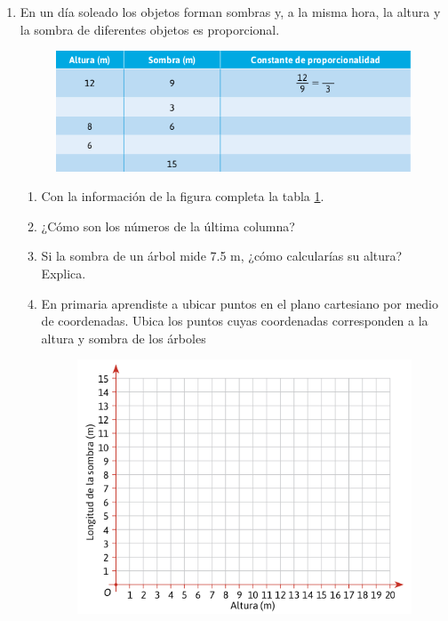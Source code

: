 \documentclass[11pt]{book}
\begin{document}
\begin{minipage}[t]{0.75\textwidth}
  \begin{enumerate}
    \item En un día soleado los objetos forman sombras y, a la misma hora, la altura y la
          sombra de diferentes objetos es proporcional.
          \begin{figure}[H]
            \raggedright
            \includegraphics[width=0.9\linewidth]{tabla_sombras.png}
            \label{tab:tabla_sombras}
          \end{figure}

          \begin{enumerate}
            \item Con la información de la figura completa la tabla \ref{tab:tabla_sombras}.
            \item ¿Cómo son los números de la última columna?
            \item Si la sombra de un árbol mide 7.5 m, ¿cómo calcularías su altura? Explica.
            \item  En primaria aprendiste a ubicar puntos en el plano cartesiano por medio de
                  coordenadas. Ubica los puntos cuyas coordenadas corresponden a la altura y sombra de los árboles
                  \begin{figure}[H]
                    \centering
                    \includegraphics[width=\linewidth]{plano_sombras.png}
                  \end{figure}

          \end{enumerate}
  \end{enumerate}
\end{minipage}
\end{document}
